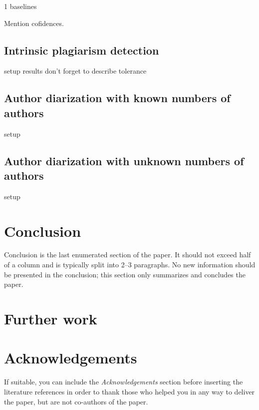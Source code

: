 \documentclass[10pt, a4paper]{article}
\begin{document}
1
baselines

Mention cofidences.

\subsection{Intrinsic plagiarism detection}

setup
results
don't forget to describe tolerance

\subsection{Author diarization with known numbers of authors}

setup

\subsection{Author diarization with unknown numbers of authors}

setup

\section{Conclusion}

Conclusion is the last enumerated section of the paper. It should not exceed half of a column and is typically split into 2--3 paragraphs. No new information should be presented in the conclusion; this section only summarizes and concludes the paper.

\section{Further work}

\section*{Acknowledgements}



If suitable, you can include the \textit{Acknowledgements} section before inserting the literature references  in order to thank those who helped you in any way to deliver the paper, but are not co-authors of the paper.
\end{document}
